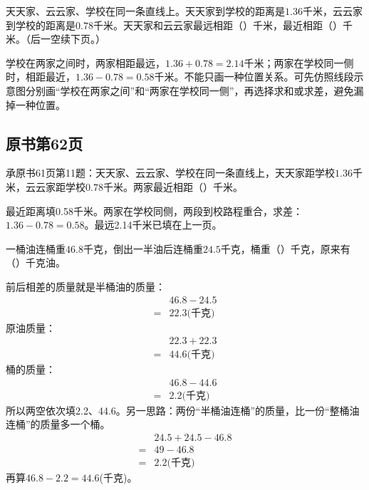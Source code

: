 天天家、云云家、学校在同一条直线上。天天家到学校的距离是\(1.36\)千米，云云家到学校的距离是\(0.78\)千米。天天家和云云家最远相距（\hspace{1.8em}）千米，最近相距（\hspace{1.8em}）千米。（后一空续下页。）\par
\begin{BookAnswer}
学校在两家之间时，两家相距最远，\allowbreak{}\(1.36+0.78=2.14\)千米；两家在学校同一侧时，相距最近，\allowbreak{}\(1.36-0.78=0.58\)千米。不能只画一种位置关系。可先仿照线段示意图分别画“学校在两家之间”和“两家在学校同一侧”，再选择求和或求差，避免漏掉一种位置。
\end{BookAnswer}



\subsection*{原书第62页}

承原书61页第11题：天天家、云云家、学校在同一条直线上，天天家距学校\(1.36\)千米，云云家距学校\(0.78\)千米。两家最近相距（\hspace{1.8em}）千米。\par
\begin{BookAnswer}
最近距离填0.58千米。两家在学校同侧，两段到校路程重合，求差：\(1.36-0.78=0.58\)。最远2.14千米已填在上一页。
\end{BookAnswer}

一桶油连桶重\(46.8\)千克，倒出一半油后连桶重\(24.5\)千克，桶重（\hspace{1.8em}）千克，原来有（\hspace{1.8em}）千克油。\par
\begin{BookAnswer}
前后相差的质量就是半桶油的质量：\[\begin{aligned}&46.8-24.5\\={}&22.3\text{(千克)}\end{aligned}\]原油质量：\[\begin{aligned}&22.3+22.3\\={}&44.6\text{(千克)}\end{aligned}\]桶的质量：\[\begin{aligned}&46.8-44.6\\={}&2.2\text{(千克)}\end{aligned}\]所以两空依次填2.2、44.6。另一思路：两份“半桶油连桶”的质量，比一份“整桶油连桶”的质量多一个桶。\[\begin{aligned}&24.5+24.5-46.8\\={}&49-46.8\\={}&2.2\text{(千克)}\end{aligned}\]再算\(46.8-2.2=44.6\)(千克)。
\end{BookAnswer}


